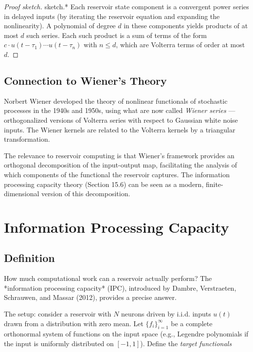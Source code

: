 \begin{proof}[Proof sketch]
sketch.* Each reservoir state component is a convergent power series in delayed
inputs (by iterating the reservoir equation and expanding the nonlinearity). A
polynomial of degree $d$ in these components yields products of at most $d$ such
series. Each such product is a sum of terms of the form
$c \cdot u(t-\tau_1) \cdots u(t-\tau_n)$ with $n \leq d$, which are Volterra terms
of order at most $d$.
\end{proof}


\subsection{Connection to Wiener's Theory}\label{sec:15.5.4}

Norbert Wiener developed the theory of nonlinear functionals of stochastic processes
in the 1940s and 1950s, using what are now called \textit{Wiener series} --- orthogonalized
versions of Volterra series with respect to Gaussian white noise inputs. The Wiener
kernels are related to the Volterra kernels by a triangular transformation.

The relevance to reservoir computing is that Wiener's framework provides an
orthogonal decomposition of the input-output map, facilitating the analysis of which
components of the functional the reservoir captures. The information processing
capacity theory (Section 15.6) can be seen as a modern, finite-dimensional version
of this decomposition.


\bigskip


\section{Information Processing Capacity}\label{sec:15.6}

\subsection{Definition}\label{sec:15.6.1}

How much computational work can a reservoir actually perform? The *information
processing capacity* (IPC), introduced by Dambre, Verstraeten, Schrauwen, and
Massar (2012), provides a precise answer.

The setup: consider a reservoir with $N$ neurons driven by i.i.d. inputs $u(t)$ drawn
from a distribution with zero mean. Let $\{f_i\}_{i=1}^{\infty}$ be a complete
orthonormal system of functions on the input space (e.g., Legendre polynomials if
the input is uniformly distributed on $[-1, 1]$). Define the \textit{target functionals}

